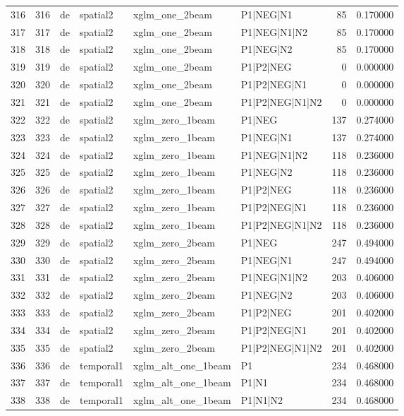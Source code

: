 \begin{tabular}{lrllllrr}
316 & 316 & de & spatial2 & xglm_one_2beam & P1|NEG|N1 & 85 & 0.170000 \\
317 & 317 & de & spatial2 & xglm_one_2beam & P1|NEG|N1|N2 & 85 & 0.170000 \\
318 & 318 & de & spatial2 & xglm_one_2beam & P1|NEG|N2 & 85 & 0.170000 \\
319 & 319 & de & spatial2 & xglm_one_2beam & P1|P2|NEG & 0 & 0.000000 \\
320 & 320 & de & spatial2 & xglm_one_2beam & P1|P2|NEG|N1 & 0 & 0.000000 \\
321 & 321 & de & spatial2 & xglm_one_2beam & P1|P2|NEG|N1|N2 & 0 & 0.000000 \\
322 & 322 & de & spatial2 & xglm_zero_1beam & P1|NEG & 137 & 0.274000 \\
323 & 323 & de & spatial2 & xglm_zero_1beam & P1|NEG|N1 & 137 & 0.274000 \\
324 & 324 & de & spatial2 & xglm_zero_1beam & P1|NEG|N1|N2 & 118 & 0.236000 \\
325 & 325 & de & spatial2 & xglm_zero_1beam & P1|NEG|N2 & 118 & 0.236000 \\
326 & 326 & de & spatial2 & xglm_zero_1beam & P1|P2|NEG & 118 & 0.236000 \\
327 & 327 & de & spatial2 & xglm_zero_1beam & P1|P2|NEG|N1 & 118 & 0.236000 \\
328 & 328 & de & spatial2 & xglm_zero_1beam & P1|P2|NEG|N1|N2 & 118 & 0.236000 \\
329 & 329 & de & spatial2 & xglm_zero_2beam & P1|NEG & 247 & 0.494000 \\
330 & 330 & de & spatial2 & xglm_zero_2beam & P1|NEG|N1 & 247 & 0.494000 \\
331 & 331 & de & spatial2 & xglm_zero_2beam & P1|NEG|N1|N2 & 203 & 0.406000 \\
332 & 332 & de & spatial2 & xglm_zero_2beam & P1|NEG|N2 & 203 & 0.406000 \\
333 & 333 & de & spatial2 & xglm_zero_2beam & P1|P2|NEG & 201 & 0.402000 \\
334 & 334 & de & spatial2 & xglm_zero_2beam & P1|P2|NEG|N1 & 201 & 0.402000 \\
335 & 335 & de & spatial2 & xglm_zero_2beam & P1|P2|NEG|N1|N2 & 201 & 0.402000 \\
336 & 336 & de & temporal1 & xglm_alt_one_1beam & P1 & 234 & 0.468000 \\
337 & 337 & de & temporal1 & xglm_alt_one_1beam & P1|N1 & 234 & 0.468000 \\
338 & 338 & de & temporal1 & xglm_alt_one_1beam & P1|N1|N2 & 234 & 0.468000 \\

\end{tabular}
